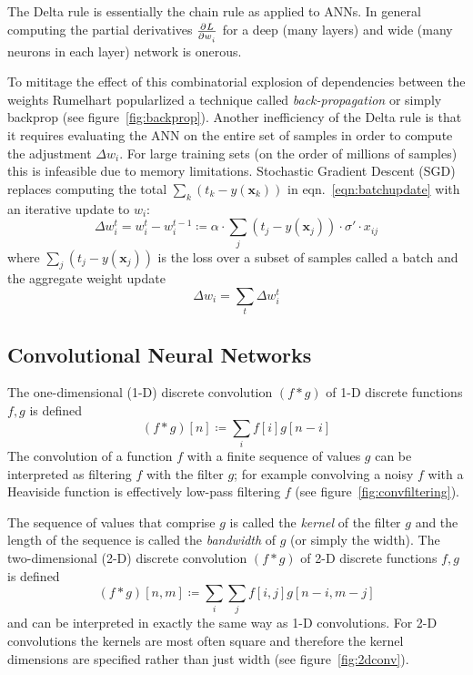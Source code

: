 The Delta rule is essentially the chain rule as applied to ANNs. 
%
In general computing the partial derivatives \(\pd{L}{w_i}\) for a deep (many layers) and wide (many neurons in each layer) network is onerous.
%

To mititage the effect of this combinatorial explosion of dependencies between the weights Rumelhart \etal\cite{rumelhart1988learning} popularlized a technique called \textit{back-propagation} or simply backprop (see figure~\ref{fig:backprop}).
%
Another inefficiency of the Delta rule is that it requires evaluating the ANN on the entire set of samples in order to compute the adjustment \(\Delta w_i\).
%
For large training sets (on the order of millions of samples) this is infeasible due to memory limitations.
%
Stochastic Gradient Descent (SGD) replaces computing the total \(\sum_k(t_k-y(\mathbf{x}_k))\) in eqn.~\eqref{eqn:batchupdate} with an iterative update to \(w_i\):
\begin{equation}
    \Delta w_i^t = w_i^t - w_i^{t-1} \coloneqq \alpha \cdot \sum_j (t_j-y(\mathbf{x}_j))\cdot \sigma'\cdot x_{ij}
    \label{eqn:sgd}
\end{equation}
where \(\sum_j (t_j-y(\mathbf{x}_j))\) is the loss over a subset of samples called a batch and the aggregate weight update
\begin{equation}
    \Delta w_i = \sum_t \Delta w_i^t
\end{equation}
%
\subsection{Convolutional Neural Networks}
The one-dimensional (1-D) discrete convolution \((f*g)\) of 1-D discrete functions \(f,g\) is defined 
\begin{equation}
    (f*g)[n]\coloneqq \sum _{i} f[i]g[n-i]
    \label{eqn:1dconv}
\end{equation}
The convolution of a function \(f\) with a finite sequence of values \(g\) can be interpreted as filtering \(f\) with the filter \(g\); for example convolving a noisy \(f\) with a Heaviside function is effectively low-pass filtering \(f\) (see figure~\ref{fig:convfiltering}).

%
The sequence of values that comprise \(g\) is called the \textit{kernel} of the filter \(g\) and the length of the sequence is called the \textit{bandwidth} of \(g\) (or simply the width).
%
The two-dimensional (2-D) discrete convolution \((f*g)\) of 2-D discrete functions \(f,g\) is defined 
\begin{equation}
    (f*g)[n, m]\coloneqq \sum _{i}\sum _{j}f[i, j]g[n-i, m-j]
    \label{eqn:2dconv}
\end{equation}
and can be interpreted in exactly the same way as 1-D convolutions.
%
For 2-D convolutions the kernels are most often square and therefore the kernel dimensions are specified rather than just width (see figure~\ref{fig:2dconv}).



